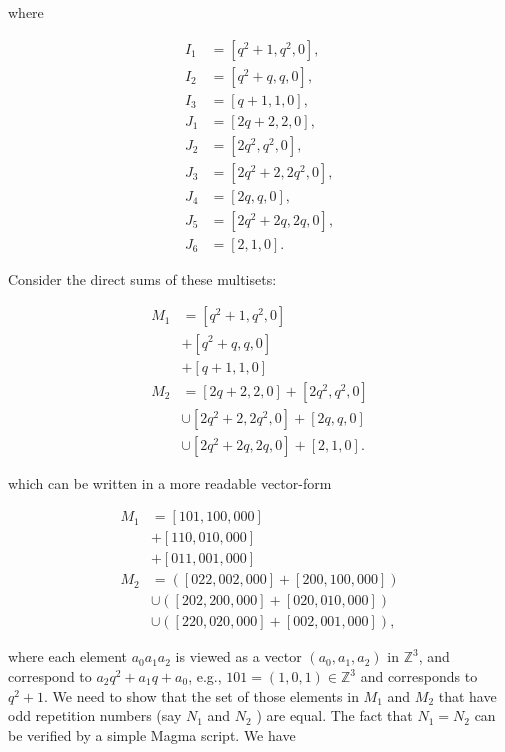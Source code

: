 \documentclass[10pt]{article}
\begin{document}
where

$$
\begin{aligned}
I_{1} & =\left[q^{2}+1, q^{2}, 0\right], \\
I_{2} & =\left[q^{2}+q, q, 0\right], \\
I_{3} & =[q+1,1,0], \\
J_{1} & =[2 q+2,2,0], \\
J_{2} & =\left[2 q^{2}, q^{2}, 0\right], \\
J_{3} & =\left[2 q^{2}+2,2 q^{2}, 0\right], \\
J_{4} & =[2 q, q, 0], \\
J_{5} & =\left[2 q^{2}+2 q, 2 q, 0\right], \\
J_{6} & =[2,1,0] .
\end{aligned}
$$

Consider the direct sums of these multisets:

$$
\begin{aligned}
M_{1} & =\left[q^{2}+1, q^{2}, 0\right] \\
& +\left[q^{2}+q, q, 0\right] \\
& +[q+1,1,0] \\
M_{2} & =[2 q+2,2,0]+\left[2 q^{2}, q^{2}, 0\right] \\
& \cup\left[2 q^{2}+2,2 q^{2}, 0\right]+[2 q, q, 0] \\
& \cup\left[2 q^{2}+2 q, 2 q, 0\right]+[2,1,0] .
\end{aligned}
$$

which can be written in a more readable vector-form

$$
\begin{aligned}
M_{1} & =[101,100,000] \\
& +[110,010,000] \\
& +[011,001,000] \\
M_{2} & =([022,002,000]+[200,100,000]) \\
& \cup([202,200,000]+[020,010,000]) \\
& \cup([220,020,000]+[002,001,000]),
\end{aligned}
$$

where each element $a_{0} a_{1} a_{2}$ is viewed as a vector $\left(a_{0}, a_{1}, a_{2}\right)$ in $\mathbb{Z}^{3}$, and correspond to $a_{2} q^{2}+a_{1} q+a_{0}$, e.g., $101=(1,0,1) \in \mathbb{Z}^{3}$ and corresponds to $q^{2}+1$. We need to show that the set of those elements in $M_{1}$ and $M_{2}$ that have odd repetition numbers (say $N_{1}$ and $N_{2}$ ) are equal. The fact that $N_{1}=N_{2}$ can be verified by a simple Magma script. We have
\end{document}
